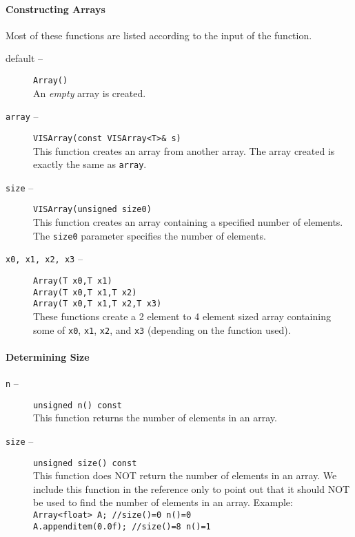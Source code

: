 \paragraph{Constructing Arrays}
Most of these functions are listed according to the input of the function.
\begin{description}
\item[default --]
{\tt Array()}\\
An {\em empty} array is created.
\item[{\tt array} --]
{\tt VISArray(const VISArray<T>\& s)}\\
This function creates an array from another array.
The array created is exactly the same as {\tt array}.
\item[{\tt size} --]
{\tt VISArray(unsigned size0)}\\
This function creates an array containing a specified number of elements.
The {\tt size0} parameter specifies the number of elements.
\item[{\tt x0, x1, x2, x3} --]
{\tt Array(T x0,T x1)}\\
{\tt Array(T x0,T x1,T x2)}\\
{\tt Array(T x0,T x1,T x2,T x3)}\\
These functions create a 2 element to 4 element sized array
containing some of {\tt x0}, {\tt x1}, {\tt x2}, and {\tt x3}
(depending on the function used).
\end{description}

\paragraph{Determining Size}
\begin{description}
\item[{\tt n} --]
{\tt unsigned n() const}\\
This function returns the number of elements in an array.
\item[{\tt size} --]
{\tt unsigned size() const}\\
This function does NOT return the number of elements in an array.
We include this function in the reference only to point out that
it should NOT be used to find the number of elements in an array.
Example:\\
{\tt Array<float> A;      //size()=0   n()=0}\\
{\tt A.appenditem(0.0f);  //size()=8   n()=1}
\end{description}

